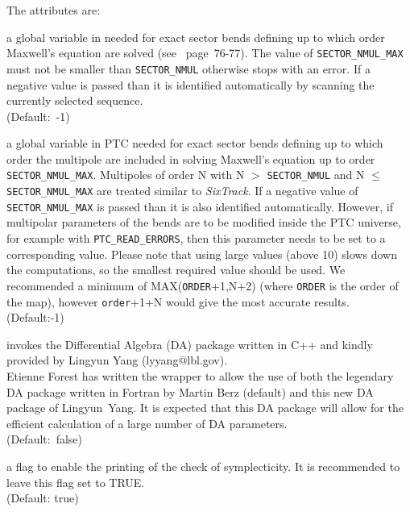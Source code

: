 The attributes are:
\begin{madlist}

    a global variable in \ptc needed for exact
   sector bends defining up to which order Maxwell's equation are solved
   (see \cite{forest2002}~page~76-77).
   The value of \texttt{SECTOR\_NMUL\_MAX} must not be smaller than
   \texttt{SECTOR\_NMUL} otherwise \madx stops with an error.
   If a negative value is passed than it is identified automatically
   by scanning the currently selected sequence.
   \\ (Default:~-1)

    a global variable in PTC needed for exact
   sector bends defining up to which order the multipole are included in
   solving Maxwell's equation up to order \texttt{SECTOR\_NMUL\_MAX}.
   Multipoles of order N with N $>$ \texttt{SECTOR\_NMUL} and N $\leq$
   \texttt{SECTOR\_NMUL\_MAX} are treated similar to \textit{SixTrack}.
   If a negative value of \\
   \texttt{SECTOR\_NMUL\_MAX} is passed than it is also identified automatically.
   However, if multipolar parameters of the bends are to be modified inside the PTC universe,
   for example with \texttt{PTC\_READ\_ERRORS},
   then this parameter needs to be set to a corresponding value.
   Please note that using large values (above 10) slows down the computations,
   so the smallest required value should be used. We recommended a minimum of
   MAX(\texttt{ORDER}+1,N+2) (where \texttt{ORDER} is the order of the map), 
   however \texttt{order}+1+N would give the most accurate results. \\
   (Default:-1)

    invokes the Differential Algebra (DA) package
   written in C++ and kindly provided by Lingyun Yang (lyyang@lbl.gov). \\
   Etienne Forest has written the wrapper to allow the use of both
   the legendary DA package written in Fortran by Martin Berz
   (default) and this new DA package of Lingyun~Yang.
   It is expected that this DA package will allow for the efficient
   calculation of a large number of DA parameters. \\ (Default:~false)

    a flag to enable the printing of the check of
   symplecticity. It is recommended to leave this flag set to TRUE. \\
   (Default: true)
\end{madlist}


